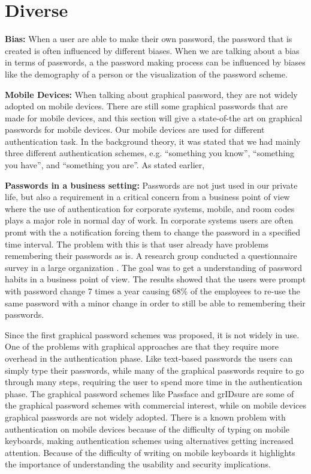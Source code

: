 \section{Diverse}

  {\bf Bias:} When a user are able to make their own password, the password that is created is often influenced by different biases.  When we are talking about a bias in terms of passwords, a the password making process can be influenced by biases like the demography of a person or the visualization of the password scheme. 
    
  {\bf Mobile Devices: } When talking about graphical password, they are not widely adopted on mobile devices. There are still some graphical passwords that are made for mobile devices, and this section will give a state-of-the art on graphical passwords for mobile devices.
  Our mobile devices are used for different authentication task. In the background theory, it was stated that we had mainly three different authentication schemes, e.g. ``something you know'', ``something you have'', and ``something you are''.
  As stated earlier, 

  {\bf Passwords in a business setting:} Passwords are not just used in our private life, but also a requirement in a critical concern from a business point of view where the use of authentication for corporate systems, mobile, and room codes plays a major role in normal day of work. In corporate systems users are often promt with the a notification forcing them to change the password in a specified time interval. The problem with this is that user already have problems remembering their passwords as is. A research group conducted a questionnaire survey in a large organization \cite{habits2}. The goal was to get a understanding of password habits in a business point of view. The results showed that the users were prompt with password change 7 times a year causing 68\% of the employees to re-use the same password with a minor change in order to still be able to remembering their passwords.

  Since the first graphical password schemes was proposed, it is not widely in use. One of the problems with graphical approaches are that they require more overhead in the authentication phase. Like text-based passwords the users can simply type their passwords, while many of the graphical passwords require to go through many steps, requiring the user to spend more time in the authentication phase. The graphical password schemes like Passface and grIDsure are some of the graphical password schemes with commercial interest, while on mobile devices graphical passwords are not widely adopted. There is a known problem with authentication on mobile devices because of the difficulty of typing on mobile keyboards, making authentication schemes using alternatives getting increased attention. Because of the difficulty of writing on mobile keyboards it highlights the importance of understanding the usability and security implications.


